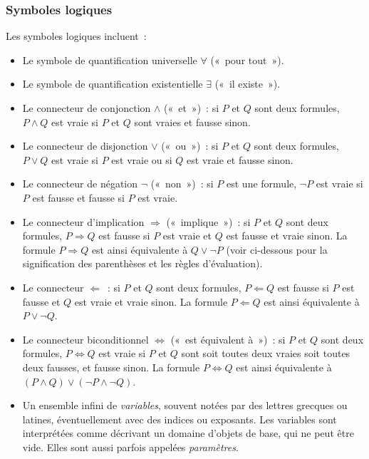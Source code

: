 \subsubsection{Symboles logiques}

Les symboles logiques incluent : 
\begin{itemize}
    \item Le symbole de quantification universelle $\forall$ (« pour tout »).
    \item Le symbole de quantification existentielle $\exists$ (« il existe »).
    \item Le connecteur de conjonction $\wedge$ (« et ») : si $P$ et $Q$ sont deux formules, $P \wedge Q$ est vraie si $P$ et $Q$ sont vraies et fausse sinon. 
    \item Le connecteur de disjonction $\vee$ (« ou ») : si $P$ et $Q$ sont deux formules, $P \vee Q$ est vraie si $P$ est vraie ou si $Q$ est vraie et fausse sinon. 
    \item Le connecteur de négation $\neg$ (« non ») : si $P$ est une formule, $\neg P$ est vraie si $P$ est fausse et fausse si $P$ est vraie. 
    \item Le connecteur d'implication $\Rightarrow$ (« implique ») : si $P$ et $Q$ sont deux formules, $P \Rightarrow Q$ est fausse si $P$ est vraie et $Q$ est fausse et vraie sinon. 
    La formule $P \Rightarrow Q$ est ainsi équivalente à $Q \vee \neg P$ (voir ci-dessous pour la signification des parenthèses et les règles d'évaluation).
    \item Le connecteur $\Leftarrow$ : si $P$ et $Q$ sont deux formules, $P \Leftarrow Q$ est fausse si $P$ est fausse et $Q$ est vraie et vraie sinon. 
    La formule $P \Leftarrow Q$ est ainsi équivalente à $P \vee \neg Q$.
    \item Le connecteur biconditionnel $\Leftrightarrow$ (« est équivalent à ») : si $P$ et $Q$ sont deux formules, $P \Leftrightarrow Q$ est vraie si $P$ et $Q$ sont soit toutes deux vraies soit toutes deux fausses, et fausse sinon. 
    La formule $P \Leftrightarrow Q$ est ainsi équivalente à $(P \wedge Q) \vee (\neg P \wedge \neg Q)$.
    \item Un ensemble infini de \textit{variables}, souvent notées par des lettres grecques ou latines, éventuellement avec des indices ou exposants. 
    Les variables sont interprétées comme décrivant un domaine d'objets de base, qui ne peut être vide. 
    Elles sont aussi parfois appelées \textit{paramètres}. 
\end{itemize}

